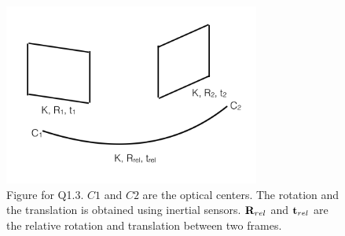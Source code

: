 \begin{figure}[h]
    \centering
    \includegraphics[width=0.75\textwidth]{images/F_E}
    \caption{Figure for Q1.3. $C1$ and $C2$ are the optical centers. The rotation and the translation is obtained using inertial sensors. ${\bf R}_{rel}$ and ${\bf t}_{rel}$ are the relative rotation and translation between two frames.}
    \label{fig:theory3}
\end{figure}

